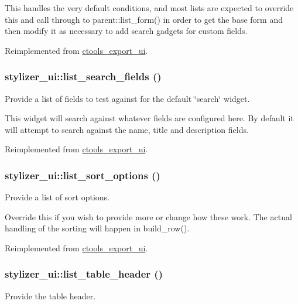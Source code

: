 This handles the very default conditions, and most lists are expected to override this and call through to parent::list\_\-form() in order to get the base form and then modify it as necessary to add search gadgets for custom fields. 

Reimplemented from \hyperlink{classctools__export__ui_a238e12ec5bfd7325bebad4f6261b6fa5}{ctools\_\-export\_\-ui}.\hypertarget{classstylizer__ui_ab1ac0677e6a6faf8ec8174366e9097df}{
\subsubsection[{list\_\-search\_\-fields}]{\setlength{\rightskip}{0pt plus 5cm}stylizer\_\-ui::list\_\-search\_\-fields ()}}
\label{classstylizer__ui_ab1ac0677e6a6faf8ec8174366e9097df}
Provide a list of fields to test against for the default \char`\"{}search\char`\"{} widget.

This widget will search against whatever fields are configured here. By default it will attempt to search against the name, title and description fields. 

Reimplemented from \hyperlink{classctools__export__ui_a6f977dc0c413c1b4a02e0846d9416598}{ctools\_\-export\_\-ui}.\hypertarget{classstylizer__ui_a2460301e4fb1ae440fab788b72b1b472}{
\subsubsection[{list\_\-sort\_\-options}]{\setlength{\rightskip}{0pt plus 5cm}stylizer\_\-ui::list\_\-sort\_\-options ()}}
\label{classstylizer__ui_a2460301e4fb1ae440fab788b72b1b472}
Provide a list of sort options.

Override this if you wish to provide more or change how these work. The actual handling of the sorting will happen in build\_\-row(). 

Reimplemented from \hyperlink{classctools__export__ui_ad9839b337e16e3c782eab7967550d3a1}{ctools\_\-export\_\-ui}.\hypertarget{classstylizer__ui_ac061b4df53f45a4832bcc133ba9b8d2d}{
\subsubsection[{list\_\-table\_\-header}]{\setlength{\rightskip}{0pt plus 5cm}stylizer\_\-ui::list\_\-table\_\-header ()}}
\label{classstylizer__ui_ac061b4df53f45a4832bcc133ba9b8d2d}
Provide the table header.

